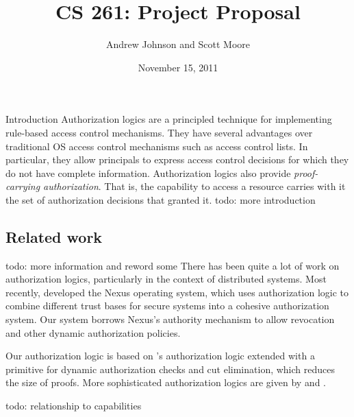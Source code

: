 \documentclass[10pt]{article}
\newcommand{\todo}[1]{{\color{red}todo: {#1}}}
\begin{document}
\title{CS 261: Project Proposal}
\author{Andrew Johnson and Scott Moore}
\date{November 15, 2011}

\maketitle

\thispagestyle{empty}

\begin{section}{Introduction}
Authorization logics are a principled technique for implementing rule-based access control mechanisms.
They have several advantages over traditional OS access control mechanisms such as access control lists.
In particular, they allow principals to express access control decisions for which they do not have complete information.
Authorization logics also provide \emph{proof-carrying authorization}. That is, the capability to access a resource carries with it the set of authorization decisions that granted it.
\todo{more introduction}

\subsection{Related work}
\todo{more information and reword some}
There has been quite a lot of work on authorization logics, particularly in the context of distributed systems.
Most recently, \citet{Nexus} developed the Nexus operating system, which uses authorization logic to combine different trust bases for secure systems into a cohesive authorization system.
Our system borrows Nexus's authority mechanism to allow revocation and other dynamic authorization policies.

Our authorization logic is based on \citet{Bauer}'s authorization logic extended with a primitive for dynamic authorization checks and cut elimination, which reduces the size of proofs.
More sophisticated authorization logics are given by \citet{AURA} and \citet{Garg}.

\todo{relationship to capabilities}
\end{section}
\end{document}
